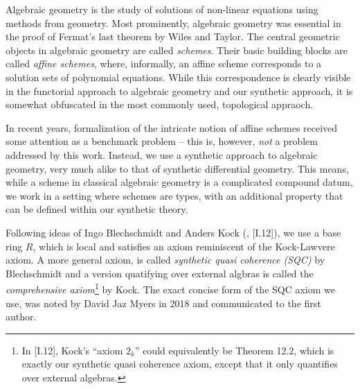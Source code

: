 
Algebraic geometry is the study of solutions of non-linear equations using methods from geometry.
Most prominently, algebraic geometry was essential in the proof of Fermat's last theorem by Wiles and Taylor.
The central geometric objects in algebraic geometry are called \emph{schemes}.
Their basic building blocks are called \emph{affine schemes},
where, informally, an affine scheme corresponds to a solution sets of polynomial equations.
While this correspondence is clearly visible in the functorial approach to algebraic geometry and our synthetic approach,
it is somewhat obfuscated in the most commonly used, topological appraoch.

In recent years,
formalization of the intricate notion of affine schemes
received some attention as a benchmark problem
-- this is, however, \emph{not} a problem addressed by this work.
Instead, we use a synthetic approach to algebraic geometry,
very much alike to that of synthetic differential geometry.
This means, while a scheme in classical algebraic geometry is a complicated compound datum,
we work in a setting where schemes are types,
with an additional property that can be defined within our synthetic theory.

Following ideas of Ingo Blechschmidt and Anders Kock  (\cite{ingo-thesis}, \cite{kock-sdg}[I.12]),
we use a base ring $R$, which is local and satisfies an axiom reminiscent of the Kock-Lawvere axiom.
A more general axiom, is called \emph{synthetic quasi coherence (SQC)} by Blechschmidt and
a version quatifying over external algbras is called the \emph{comprehensive axiom}\footnote{
  In \cite{kock-sdg}[I.12], Kock's ``axiom $2_k$'' could equivalently be Theorem 12.2,
  which is exactly our synthetic quasi coherence axiom, except that it only quantifies over external algebras.
}
by Kock.
The exact concise form of the SQC axiom we use, was noted by David Jaz Myers in 2018 and communicated to the first author.

